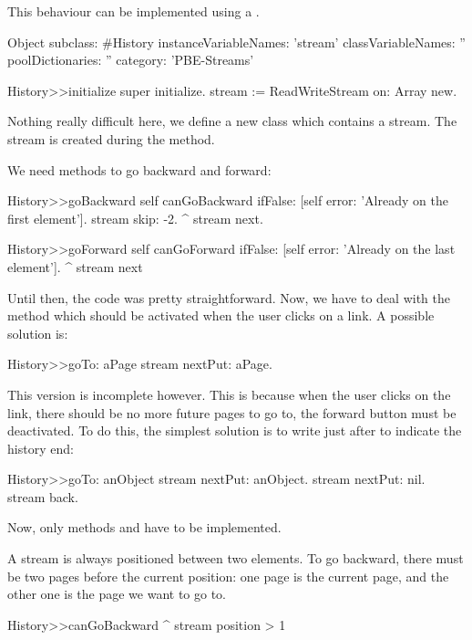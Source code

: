 \documentclass[a4paper,10pt,twoside]{book}
\begin{document}
{This behaviour can be implemented using a .

\begin{code}{}
Object subclass: #History
  instanceVariableNames: 'stream'
  classVariableNames: ''
  poolDictionaries: ''
  category: 'PBE-Streams'

History>>initialize
    super initialize.
    stream := ReadWriteStream on: Array new.
\end{code}

Nothing really difficult here, we define a new class which contains a
stream. The stream is created during the  method.

We need methods to go backward and forward:

\begin{code}{}
History>>goBackward
  self canGoBackward ifFalse: [self error: 'Already on the first element'].
  stream skip: -2.
  ^ stream next.

History>>goForward
  self canGoForward ifFalse: [self error: 'Already on the last element'].
  ^ stream next
\end{code}

Until then, the code was pretty straightforward. Now, we have to deal
with the  method which should be activated when the user
clicks on a link. A possible solution is:

\begin{code}{}
History>>goTo: aPage
    stream nextPut: aPage.
\end{code}

This version is incomplete however. This is because when the user
clicks on the link, there should be no more future pages to go to,
\ie the forward button must be deactivated. To do this, the simplest
solution is to write  just after to indicate the history end:

\begin{code}{}
History>>goTo: anObject
  stream nextPut: anObject.
  stream nextPut: nil.
  stream back.
\end{code}

Now, only methods  and  have to be
implemented.

A stream is always positioned between two elements. To go backward,
there must be two pages before the current position: one page is the
current page, and the other one is the page we want to go to.

\begin{code}{}
History>>canGoBackward
  ^ stream position > 1


\end{code}}
\end{document}
